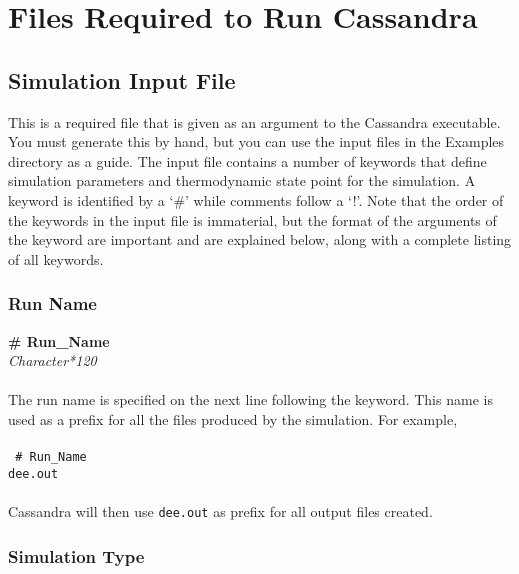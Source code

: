 \chapter{Files Required to Run Cassandra}
\label{ch:input_files}

\section{Simulation Input File} \label{sec:Input_File}
This is a required file that is given as an argument to the Cassandra
executable. You must generate this by hand, but you can use the input files in the Examples directory as a guide. The input file contains a number of keywords that define simulation parameters
and thermodynamic state point for the simulation. A keyword is identified
by a `\#' while comments follow a `!'. Note that the order of the keywords in the input
file is immaterial, but the format of the arguments of the keyword are
important and are explained below, along with a complete listing of
all keywords. 
%
%
%
\subsection{Run Name}\label{sec:Run_Name}
{\bf \# Run\_Name}\\
{\it Character*120} \\ \\
%
The run name is specified on the next line following the keyword. This name is used as a prefix for all the files
produced by the simulation. For example,\\ \\
%
{\tt{
\# Run\_Name \\
dee.out
}} \\ \\
%
Cassandra will then use \texttt{dee.out} as prefix for all output files created.

%
%
%
\subsection{Simulation Type}\label{sec:Sim_Type}


